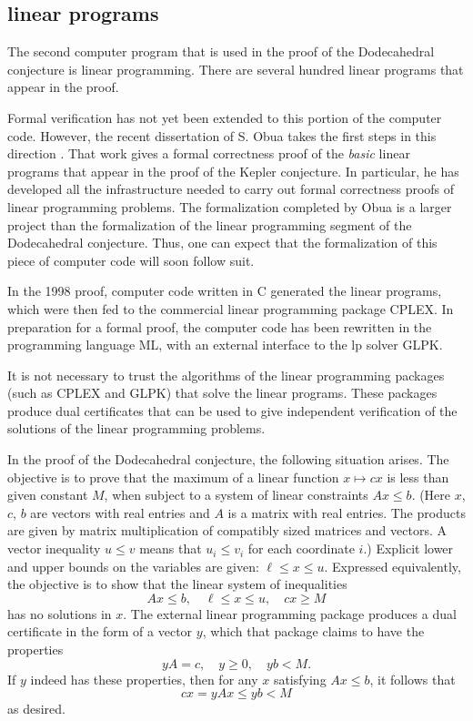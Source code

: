 
\subsection{linear programs}

The second computer 
program that is used in the proof of the Dodecahedral
conjecture is linear programming.  There are several hundred
linear programs that appear in the proof.

Formal verification has not yet been extended to this portion
of the computer code.  However, the recent dissertation of
S. Obua takes the first steps in this direction \cite{Ob}.
That work gives a formal correctness proof of the {\it basic} linear
programs that appear in the proof of the Kepler conjecture.
In particular, he has developed all the infrastructure needed to
carry out formal correctness proofs of linear programming problems.
The formalization  completed by Obua is a larger project than the
formalization of the linear programming segment of the Dodecahedral
conjecture.
Thus, one can expect that the formalization of this piece of
computer code  will soon follow suit.

In the 1998 proof, computer code written in C  generated 
the linear programs, which were then fed to the 
commercial linear programming
package CPLEX.  In preparation for a formal proof, the computer
code has been rewritten in the programming language ML, with
an external interface to the lp solver GLPK.

It is not necessary to trust the algorithms of the
linear programming packages (such as CPLEX and GLPK) that solve
the linear programs.  These packages produce dual certificates that
can be used to give independent verification of the solutions
of the linear programming problems.

In the proof of the Dodecahedral conjecture,   the
following situation arises.  The objective is 
to prove that the maximum of a
linear function 
$x\mapsto c x$ is less than given constant $M$, when subject
to a system of linear constraints $A x \le b$.  (Here $x$, $c$, $b$
are vectors with real entries and $A$ is a matrix with real
entries.  The products are given by matrix multiplication of compatibly sized matrices and vectors. 
A vector inequality $u\le v$
means that $u_i \le v_i$ for each coordinate $i$.) 
Explicit lower and upper bounds on the variables
are given: $\ell \le x \le u$.
Expressed equivalently, the objective is to show that the linear 
system of inequalities
  $$
  A x \le b,\quad \ell \le x\le u,\quad c x \ge M
  $$
has no solutions in $x$.
The external linear programming package produces a dual certificate
in the form of a vector $y$, which that package claims to have
the properties 
  \begin{equation}
  y A = c,\quad y\ge 0,\quad y b < M.
  \end{equation}
If $y$ indeed has these properties, then for any $x$ satisfying
$A x \le b$, it follows that
   \begin{equation}\label{eqn:cxM}
   c x = y A x \le y b < M
   \end{equation}
as desired.

